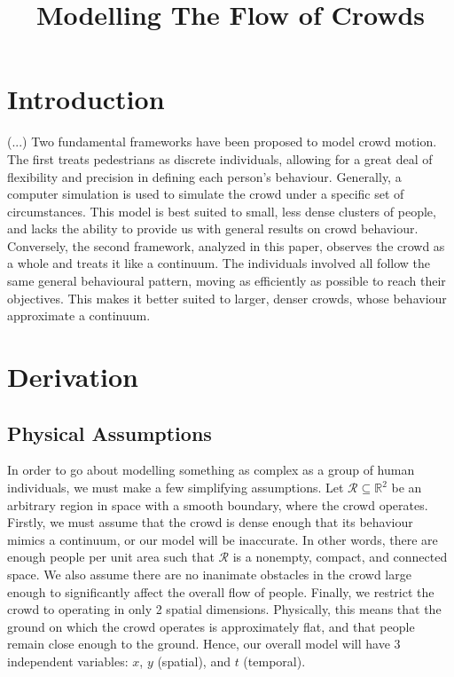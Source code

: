 \documentclass{article}
\title{Modelling The Flow of Crowds}
\begin{document}
\maketitle

\section{Introduction}
(...)
Two fundamental frameworks have been proposed to model crowd motion. The first treats pedestrians as discrete individuals, allowing for a great deal of flexibility and precision in defining each person's behaviour. Generally, a computer simulation is used to simulate the crowd under a specific set of circumstances. This model is best suited to small, less dense clusters of people, and lacks the ability to provide us with general results on crowd behaviour. Conversely, the second framework, analyzed in this paper, observes the crowd as a whole and treats it like a continuum. The individuals involved all follow the same general behavioural pattern, moving as efficiently as possible to reach their objectives. This makes it better suited to larger, denser crowds, whose behaviour approximate a continuum.

\section{Derivation}
\subsection{Physical Assumptions}
\newcommand\Rpix{\mathcal R_{\text{\texttt{px}}}}
\newcommand{\brydon}{\texttt{Brydon}}
In order to go about modelling something as complex as a group of human individuals, we must make a few simplifying assumptions. Let $\mathcal R\subseteq\mathbb R^2$ be an arbitrary region in space with a smooth boundary, where the crowd operates. Firstly, we must assume that the crowd is dense enough that its behaviour mimics a continuum, or our model will be inaccurate. In other words, there are enough people per unit area such that $\mathcal R$ is a nonempty, compact, and connected space. We also assume there are no inanimate obstacles in the crowd large enough to significantly affect the overall flow of people. Finally, we restrict the crowd to operating in only 2 spatial dimensions. Physically, this means that the ground on which the crowd operates is approximately flat, and that people remain close enough to the ground. Hence, our overall model will have 3 independent variables: $x$, $y$ (spatial), and $t$ (temporal).
\end{document}
